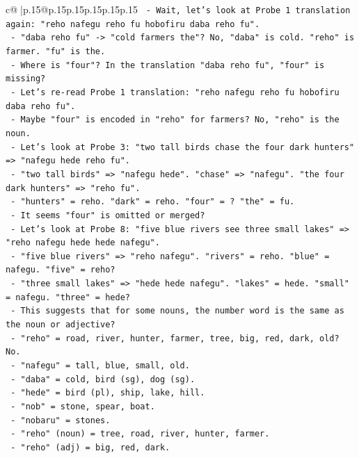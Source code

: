 \documentclass{article}
\begin{document}
{\begin{supertabular}{c@{$\;$}|p{.15\linewidth}@{}p{.15\linewidth}p{.15\linewidth}p{.15\linewidth}p{.15\linewidth}p{.15\linewidth}}
{{{\texttt{   {-} Wait, let's look at Probe 1 translation again: "reho nafegu reho fu hobofiru daba reho fu".} \\
\texttt{   {-} "daba reho fu" {-}> "cold farmers the"? No, "daba" is cold. "reho" is farmer. "fu" is the.} \\
\texttt{   {-} Where is "four"? In the translation "daba reho fu", "four" is missing?} \\
\texttt{   {-} Let's re{-}read Probe 1 translation: "reho nafegu reho fu hobofiru daba reho fu".} \\
\texttt{   {-} Maybe "four" is encoded in "reho" for farmers? No, "reho" is the noun.} \\
\texttt{   {-} Let's look at Probe 3: "two tall birds chase the four dark hunters" => "nafegu hede reho fu".} \\
\texttt{   {-} "two tall birds" => "nafegu hede". "chase" => "nafegu". "the four dark hunters" => "reho fu".} \\
\texttt{   {-} "hunters" = reho. "dark" = reho. "four" = ? "the" = fu.} \\
\texttt{   {-} It seems "four" is omitted or merged?} \\
\texttt{   {-} Let's look at Probe 8: "five blue rivers see three small lakes" => "reho nafegu hede hede nafegu".} \\
\texttt{   {-} "five blue rivers" => "reho nafegu". "rivers" = reho. "blue" = nafegu. "five" = reho?} \\
\texttt{   {-} "three small lakes" => "hede hede nafegu". "lakes" = hede. "small" = nafegu. "three" = hede?} \\
\texttt{   {-} This suggests that for some nouns, the number word is the same as the noun or adjective?} \\
\texttt{   {-} "reho" = road, river, hunter, farmer, tree, big, red, dark, old? No.} \\
\texttt{   {-} "nafegu" = tall, blue, small, old.} \\
\texttt{   {-} "daba" = cold, bird (sg), dog (sg).} \\
\texttt{   {-} "hede" = bird (pl), ship, lake, hill.} \\
\texttt{   {-} "nob" = stone, spear, boat.} \\
\texttt{   {-} "nobaru" = stones.} \\
\texttt{   {-} "reho" (noun) = tree, road, river, hunter, farmer.} \\
\texttt{   {-} "reho" (adj) = big, red, dark.} \\
}}}
\end{supertabular}}
\end{document}
